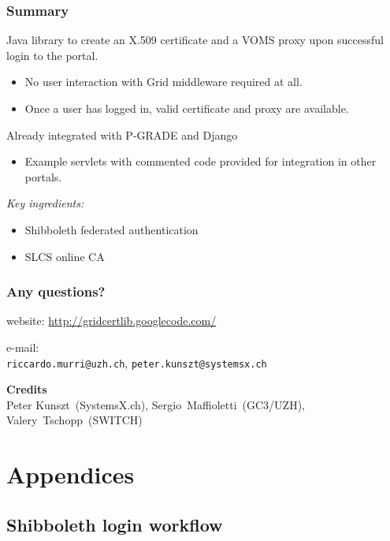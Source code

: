 \documentclass{beamer}
\newcommand{\+}{\vspace{1em}}
\begin{document}
\begin{frame}[label=summary]
  \frametitle{Summary}
  
  Java library to create an X.509 certificate and a VOMS proxy upon
  successful login to the portal.
  \begin{itemize}
  \item No user interaction with Grid middleware required at all.
  \item Once a user has logged in, valid certificate and proxy are
    available.
  \end{itemize}

  \+
  Already integrated with P-GRADE and Django
  \begin{itemize}
  \item Example servlets with commented code provided for integration
    in other portals.
  \end{itemize}

  \+
  \emph{Key ingredients:}
  \begin{itemize}
  \item Shibboleth federated authentication
  \item SLCS online CA
  \end{itemize}
\end{frame}


\begin{frame}
  \frametitle{Any questions?}
  \begin{center}\Large
    website: \url{http://gridcertlib.googlecode.com/}

    \+
    {e-mail: \\ \texttt{riccardo.murri@uzh.ch}, \texttt{peter.kunszt@systemsx.ch}}

    \+
    \textbf{Credits} \\
    Peter Kunszt~(SystemsX.ch),
    Sergio~Maffioletti~(GC3/UZH),
    Valery~Tschopp~(SWITCH)
  \end{center}
\end{frame}




\section{Appendices}


\subsection{Shibboleth login workflow}
\end{document}
